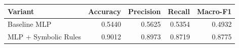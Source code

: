 \begin{tabular}{lrrrr}
\hline
Variant & Accuracy & Precision & Recall & Macro-F1 \\
\hline
Baseline MLP & 0.5440 & 0.5625 & 0.5354 & 0.4932 \\
MLP + Symbolic Rules & 0.9012 & 0.8973 & 0.8719 & 0.8775 \\
\hline
\end{tabular}
